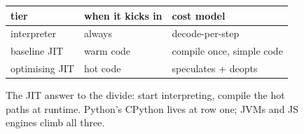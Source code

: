 \begin{figure}[htbp]
\centering
\begin{tabular}{lll}
\toprule
tier & when it kicks in & cost model \\
\midrule
interpreter & always & decode-per-step \\
baseline JIT & warm code & compile once, simple code \\
optimising JIT & hot code & speculates + deopts \\
\bottomrule
\end{tabular}
\caption{The JIT answer to the divide: start interpreting, compile
the hot paths at runtime. Python's CPython lives at row one;
JVMs and JS engines climb all three.}
\label{fig:jit18}
\end{figure}
